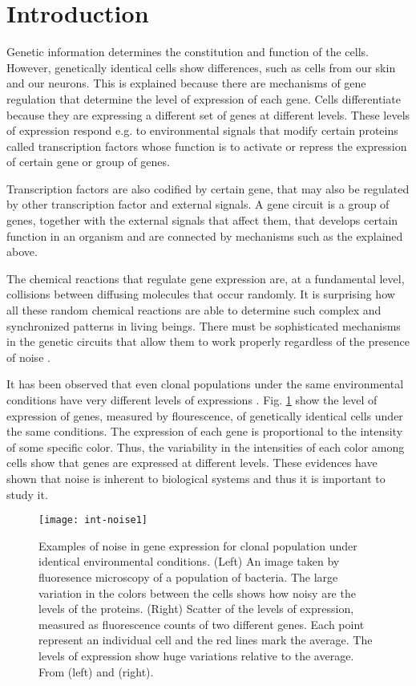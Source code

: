 \chapter*{Introduction}
\renewcommand{\thefigure}{I.\arabic{figure}}

Genetic information determines the constitution and function of the cells. However, genetically identical cells show differences, such as cells from our skin and our neurons. This is explained because there are mechanisms of gene regulation that determine the level of expression of each gene. Cells differentiate because they are expressing a different set of genes at different levels. These levels of expression respond e.g. to environmental signals that modify certain proteins called transcription factors whose function is to activate or repress the expression of certain gene or group of genes.

Transcription factors are also codified by certain gene, that may also be regulated by other transcription factor and external signals. A gene circuit is a group of genes, together with the external signals that affect them, that develops certain function in an organism and are connected by mechanisms such as the explained above.

The chemical reactions that regulate gene expression are, at a fundamental level, collisions between diffusing molecules that occur randomly. It is surprising how all these random chemical reactions are able to determine such complex and synchronized patterns in living beings. There must be sophisticated mechanisms in the genetic circuits that allow them to work properly regardless of the presence of noise \cite{kaern05} \cite{raj08}.

It has been observed that even clonal populations under the same environmental conditions have very different levels of expressions \cite{elowitz02} \cite{pedraza05}. Fig. \ref{fig:int-noise1} show the level of expression of genes, measured by flourescence, of genetically identical cells under the same conditions. The expression of each gene is proportional to the intensity of some specific color. Thus, the variability in the intensities of each color among cells show that genes are expressed at different levels. These evidences have shown that noise is inherent to biological systems and thus it is important to study it.

\begin{figure}[H]
  \centering
  \texttt{[image: int-noise1]}
  \caption[Examples of noise in gene expression]{\label{fig:int-noise1}Examples of noise in gene expression for clonal population under identical environmental conditions. (Left) An image taken by fluoresence microscopy of a population of bacteria. The large variation in the colors between the cells shows how noisy are the levels of the proteins. (Right) Scatter of the levels of expression, measured as fluorescence counts of two different genes. Each point represent an individual cell and the red lines mark the average. The levels of expression show huge variations relative to the average. From \cite{elowitz02} (left) and \cite{pedraza05} (right).}
\end{figure}

